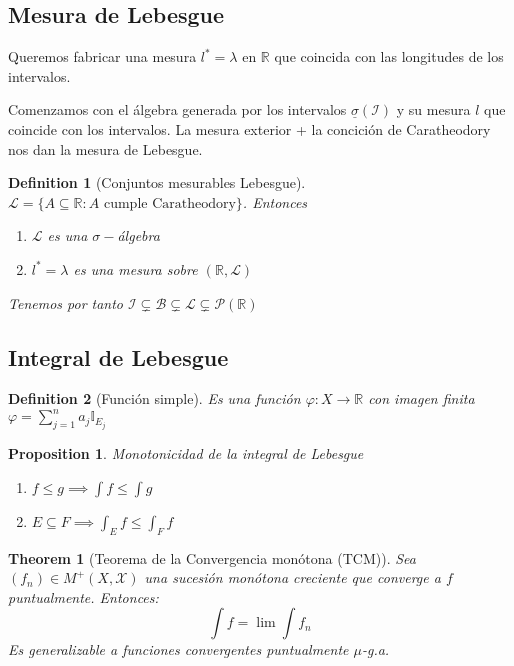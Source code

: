 \documentclass[leqno]{article}
\newtheorem*{definition}{Definition}
\newtheorem*{theorem}{Theorem}
\newtheorem*{proposition}{Proposition}
\begin{document}
\subsection{Mesura de Lebesgue}
Queremos fabricar una mesura $l^*=\lambda$ en $\mathbb{R}$ que coincida con las longitudes de los intervalos.

Comenzamos con el álgebra generada por los intervalos $\underline{\sigma }(\mathcal{I})$ y su mesura $l$ que coincide con los intervalos. La mesura exterior + la concición de Caratheodory nos dan la mesura de Lebesgue.

\begin{definition}[Conjuntos mesurables Lebesgue]$ \mathcal{L} =  \{A\subseteq \mathbb{R}: A \text{ cumple Caratheodory}\}$. Entonces
  \begin{enumerate}[topsep=-6pt, itemsep=0pt]
    \item $\mathcal{L}$ es una $\sigma-$álgebra
	\item $l^*=\lambda$ es una mesura sobre $(\mathbb{R}, \mathcal{L})$
  \end{enumerate}

  Tenemos por tanto $\mathcal{I} \subsetneq \mathcal{B} \subsetneq \mathcal{L} \subsetneq \mathcal{P}(\mathbb{R}) $

\end{definition}

\subsection{Integral de Lebesgue}
\begin{definition}[Función simple]
Es una función $\varphi : X \to \mathbb{R}$ con imagen finita $\varphi = \sum_{j=1}^n a_j \mathbb{I}_{E_j}$
\end{definition}

\begin{proposition}
Monotonicidad de la integral de Lebesgue 
\begin{enumerate}[topsep=-6pt, itemsep=0pt]
  \item $f\le g \implies \int f \le \int g$
  \item $E\subseteq F \implies \int_E f\le \int_F f$
\end{enumerate}
\end{proposition}

\begin{theorem}[Teorema de la Convergencia monótona (TCM)]
Sea $(f_n) \in M^+(X, \mathcal{X})$ una sucesión monótona creciente que converge a $f$ puntualmente. Entonces:
\[
\int f= \lim \int f_n
\] 
Es generalizable a funciones convergentes puntualmente $\mu$-g.a.
\end{theorem}
\end{document}
